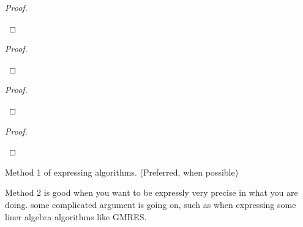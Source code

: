 \begin{appendices}
\begin{ftheo}
   \blindtext[1]
\end{ftheo}
 \begin{proof}
\begin{alphalist}
  \item \blindtext[1]
  \item \blindtext[1]
\end{alphalist}
\end{proof}

\newchunk
\begin{flem}
   \blindtext[1]
\end{flem}
 \begin{proof}
\begin{alphalist}
  \item \blindtext[1]
  \item \blindtext[1]
\end{alphalist}
\end{proof}

\newchunk
\begin{fcor}
   \blindtext[1]
\end{fcor}
 \begin{proof}
\begin{alphalist}
  \item {} \blindtext[1]
  \item {} \blindtext[1]
  \item {} \blindtext[1]
\end{alphalist}
\end{proof}

\newchunk
\begin{fprop}
   \blindtext[1]
\end{fprop}
 \begin{proof}
\begin{alphalist}
  \item {} \blindtext[1]
  \item {} \blindtext[1]
  \item {} \blindtext[1]
\end{alphalist}
\end{proof}

\newchunk Method 1 of expressing algorithms. (Preferred, when possible)

Method 2 is good when you want to be expressly very precise in what you
are doing. some complicated argument is going on, such as when expressing
some liner algebra algorithms like GMRES. 


\end{appendices}
